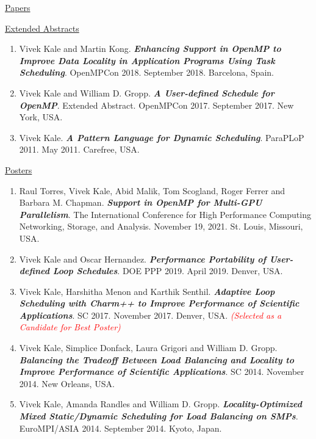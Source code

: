 \underline{Papers}
\begin{enumerate} 
\myPapers
\end{enumerate} 

\underline{Extended Abstracts}
\begin{enumerate}
\item Vivek Kale and Martin Kong. \textbf{\textit{Enhancing Support in OpenMP to Improve Data Locality in Application Programs Using Task Scheduling}}. OpenMPCon 2018. September 2018. Barcelona, Spain.
\item Vivek Kale and William D. Gropp. \textbf{\textit{A User-defined Schedule for OpenMP}}. Extended Abstract. OpenMPCon
  2017. September 2017. New York, USA.
\item Vivek Kale. \textbf{\textit{A Pattern Language for Dynamic Scheduling}}. ParaPLoP 2011. May 2011. Carefree, USA.
\end{enumerate}

\underline{Posters}
\begin{enumerate}
\item Raul Torres, Vivek Kale, Abid Malik, Tom Scogland, Roger Ferrer and Barbara M. Chapman. \textbf{\textit{Support in OpenMP for Multi-GPU Parallelism}}. The International Conference for High Performance Computing Networking, Storage, and Analysis. November 19, 2021. St. Louis, Missouri, USA.
\item Vivek Kale and Oscar Hernandez. {\bf\textit{Performance Portability of User-defined Loop Schedules}}. DOE PPP 2019. April 2019. Denver, USA.
\item Vivek Kale, Harshitha Menon and Karthik Senthil. \textbf{\textit{Adaptive Loop Scheduling with Charm++ to Improve Performance of Scientific Applications}}. SC 2017. November 2017. Denver, USA. \textit{\textcolor{red}{(Selected as a Candidate for Best Poster)}}
\item Vivek Kale, Simplice Donfack, Laura Grigori and William D. Gropp. \textbf{\textit{Balancing the Tradeoff Between Load Balancing and Locality to Improve Performance of Scientific Applications}}. SC 2014. November 2014. New Orleans, USA.
\item Vivek Kale, Amanda Randles and William D. Gropp. \textbf{\textit{Locality-Optimized Mixed Static/Dynamic
      Scheduling for Load Balancing on SMPs}}. EuroMPI/ASIA 2014. September 2014. Kyoto, Japan.
\end{enumerate}



